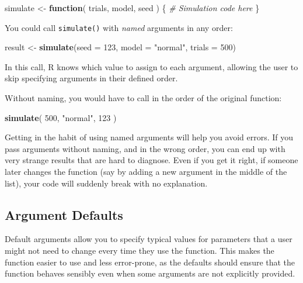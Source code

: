 \documentclass[
]{book}
\newenvironment{Shaded}{\begin{snugshade}}{\end{snugshade}}
\newcommand{\AttributeTok}[1]{\textcolor[rgb]{0.13,0.29,0.53}{#1}}
\newcommand{\CommentTok}[1]{\textcolor[rgb]{0.56,0.35,0.01}{\textit{#1}}}
\newcommand{\ControlFlowTok}[1]{\textcolor[rgb]{0.13,0.29,0.53}{\textbf{#1}}}
\newcommand{\DecValTok}[1]{\textcolor[rgb]{0.00,0.00,0.81}{#1}}
\newcommand{\FunctionTok}[1]{\textcolor[rgb]{0.13,0.29,0.53}{\textbf{#1}}}
\newcommand{\NormalTok}[1]{#1}
\newcommand{\OtherTok}[1]{\textcolor[rgb]{0.56,0.35,0.01}{#1}}
\newcommand{\StringTok}[1]{\textcolor[rgb]{0.31,0.60,0.02}{#1}}
\begin{document}
\begin{Shaded}
\begin{Highlighting}[]
\NormalTok{simulate }\OtherTok{\textless{}{-}} \ControlFlowTok{function}\NormalTok{( trials, model, seed ) \{}
  \CommentTok{\# Simulation code here}
\NormalTok{\}}
\end{Highlighting}
\end{Shaded}

You could call \texttt{simulate()} with \emph{named} arguments in any order:

\begin{Shaded}
\begin{Highlighting}[]
\NormalTok{result }\OtherTok{\textless{}{-}} \FunctionTok{simulate}\NormalTok{(}\AttributeTok{seed =} \DecValTok{123}\NormalTok{, }\AttributeTok{model =} \StringTok{"normal"}\NormalTok{, }\AttributeTok{trials =} \DecValTok{500}\NormalTok{)}
\end{Highlighting}
\end{Shaded}

In this call, R knows which value to assign to each argument, allowing the user to skip specifying arguments in their defined order.

Without naming, you would have to call in the order of the original function:

\begin{Shaded}
\begin{Highlighting}[]
\FunctionTok{simulate}\NormalTok{( }\DecValTok{500}\NormalTok{, }\StringTok{"normal"}\NormalTok{, }\DecValTok{123}\NormalTok{ )}
\end{Highlighting}
\end{Shaded}

Getting in the habit of using named arguments will help you avoid errors.
If you pass arguments without naming, and in the wrong order, you can end up with very strange results that are hard to diagnose.
Even if you get it right, if someone later changes the function (say by adding a new argument in the middle of the list), your code will suddenly break with no explanation.

\subsection{Argument Defaults}\label{argument-defaults}

Default arguments allow you to specify typical values for parameters that a user might not need to change every time they use the function.
This makes the function easier to use and less error-prone, as the defaults should ensure that the function behaves sensibly even when some arguments are not explicitly provided.
\end{document}
